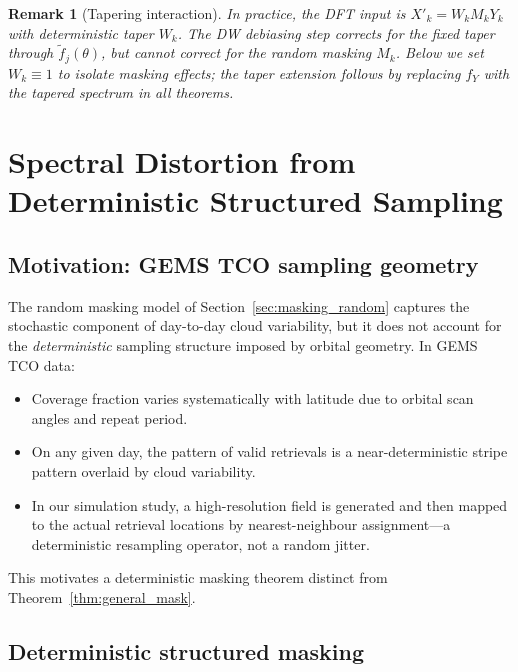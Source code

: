 \documentclass[12pt]{article}
\newtheorem{remark}{Remark}
\begin{document}
\begin{remark}[Tapering interaction]
\label{rem:taper}
In practice, the DFT input is $X'_k = W_k M_k Y_k$ with deterministic
taper $W_k$.  The DW debiasing step corrects for the fixed taper through
$\tilde{f}_j(\theta)$, but cannot correct for the random masking $M_k$.
Below we set $W_k \equiv 1$ to isolate masking effects; the taper
extension follows by replacing $f_Y$ with the tapered spectrum in all
theorems.
\end{remark}


\section{Spectral Distortion from Deterministic Structured Sampling}
\label{sec:masking_det}

\subsection{Motivation: GEMS TCO sampling geometry}

The random masking model of Section~\ref{sec:masking_random} captures the
stochastic component of day-to-day cloud variability, but it does not
account for the \emph{deterministic} sampling structure imposed by orbital
geometry.
In GEMS TCO data:
\begin{itemize}
  \item Coverage fraction varies systematically with latitude due to
        orbital scan angles and repeat period.
  \item On any given day, the pattern of valid retrievals is a
        near-deterministic stripe pattern overlaid by cloud variability.
  \item In our simulation study, a high-resolution field is generated
        and then mapped to the actual retrieval locations by
        nearest-neighbour assignment---a deterministic resampling
        operator, not a random jitter.
\end{itemize}
This motivates a deterministic masking theorem distinct from
Theorem~\ref{thm:general_mask}.

\subsection{Deterministic structured masking}
\end{document}
